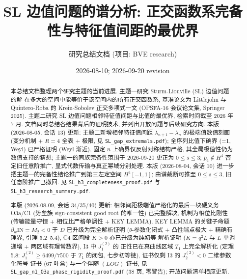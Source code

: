\documentclass[UTF8]{ctexart}
\title{SL 边值问题的谱分析: 正交函数系完备性与特征值间距的最优界}
\author{研究总结文档 (项目: BVE research)}
\date{2026-08-10; 2026-09-20 revision}
\begin{document}
\maketitle

\begin{abstract}
本总结文档整理两个研究主题的当前进展. 主题一研究 Sturm-Liouville (SL) 边值问题的解
在多大的空间中能等价于该空间内的所有正交函数系, 基准论文为 Littlejohn 与
Quintero-Roba 的 Krein-Sobolev 正交多项式一文 (OPSFA-16 会议论文集, Springer 2025).
主题二研究 SL 边值问题相邻特征值间距与比值的最优界, 检索时间截至 2026 年 7 月.
文档同时总结各结果背后的证明技术, 并列出开放问题与后续研究方向. 本版 (2026-08-05, 会话 13) 更新: 主题二新增相邻特征值间距 $\lambda_{n+1}-\lambda_n$ 的极端值数值刻画 (变分机制 + $R=4$ 全表 + 极限, 见 \texttt{SL\_gap\_extremals.pdf}); 全序列比值下确界 (=1, Weyl) 已严格证明 (Weyl 渐近), 固定 $n$ 上确界仅反射对称结构严格, 其全局极值性仍为数值支持的猜想; 主题一的同族完备性范围于 2026-09-20 更正为 $0\le s\le3$; $p_4\notin H^4$ 否定旧任意阶推广, 显式代数传输与真正幂域分别处理.
本版 (2026-08-04, 会话 10) 进一步把主题一的完备性结论推广到第三左定空间
$H^3[-1,1]$; 由谱截断可推至 $0\le s\le3$, 旧任意阶推广已撤回. 见
\texttt{SL\_h3\_completeness\_proof.pdf} 与 \texttt{SL\_h3\_research\_summary.pdf}.

本版 (2026-08-09, 会话 34/35/40) 更新: 相邻间距极端值严格化的最后一块硬义务 O3a/C1
(势垒族 sign-consistent good root 的唯一性) 已完整解决, 机制为相位比刚性
(传输能量守恒 + 相位比严格单调性 + KEY LEMMA). KEY LEMMA 的关键子命题
$\partial_w\mathrm{IN}=M_2<0$ 于 $D$ 已升级为完全解析证明 ($\theta$-参数化闭式 +
凸性端点极大 + 精确有理界, 引理 5.2--5.4), C4 区间段 $K>0$ 亦已升级为纯初等
解析证明 ($K=q^2L$ 与 $L$ 单调递增 + 两区域有理常数界), I3 中 $J_1^{(2)}$ 的
正性已在真曲线区域 $T_1$ 上完全解析化 (定理 5.8: $J_1^{(2)}\ge6499/7500$
于 $T_1$ 的闭包, 七步初等链), 证书仅剩 I3 的 $J_2^{(2)}<0$ 二维参数化符号
证书 (67 叶盒) 与一个伴随 $(LOG)$ 证书, 见 \texttt{SL\_gap\_n1\_O3a\_phase\_rigidity\_proof.pdf}
(38 页, 零警告); 开放问题清单相应更新.


\end{abstract}
\end{document}
